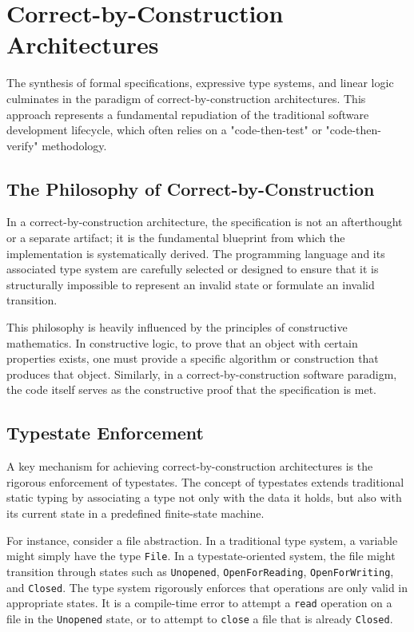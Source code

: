 \section{Correct-by-Construction Architectures}

The synthesis of formal specifications, expressive type systems, and linear logic culminates in the paradigm of correct-by-construction architectures. This approach represents a fundamental repudiation of the traditional software development lifecycle, which often relies on a "code-then-test" or "code-then-verify" methodology.

\subsection{The Philosophy of Correct-by-Construction}

In a correct-by-construction architecture, the specification is not an afterthought or a separate artifact; it is the fundamental blueprint from which the implementation is systematically derived. The programming language and its associated type system are carefully selected or designed to ensure that it is structurally impossible to represent an invalid state or formulate an invalid transition.

This philosophy is heavily influenced by the principles of constructive mathematics. In constructive logic, to prove that an object with certain properties exists, one must provide a specific algorithm or construction that produces that object. Similarly, in a correct-by-construction software paradigm, the code itself serves as the constructive proof that the specification is met.

\subsection{Typestate Enforcement}

A key mechanism for achieving correct-by-construction architectures is the rigorous enforcement of typestates. The concept of typestates extends traditional static typing by associating a type not only with the data it holds, but also with its current state in a predefined finite-state machine.

For instance, consider a file abstraction. In a traditional type system, a variable might simply have the type \texttt{File}. In a typestate-oriented system, the file might transition through states such as \texttt{Unopened}, \texttt{OpenForReading}, \texttt{OpenForWriting}, and \texttt{Closed}. The type system rigorously enforces that operations are only valid in appropriate states. It is a compile-time error to attempt a \texttt{read} operation on a file in the \texttt{Unopened} state, or to attempt to \texttt{close} a file that is already \texttt{Closed}.


